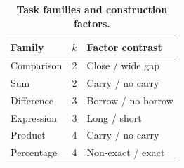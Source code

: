\begin{table}[H]
\caption{\textbf{Task families and construction factors.}}
\label{tab:families}
\centering\tablefont
\setlength{\tabcolsep}{4pt}
\begin{tabular}{@{}l c l@{}}
\toprule
\textbf{Family} & {$k$} & \textbf{Factor contrast} \\
\midrule
Comparison & 2 & Close / wide gap \\
Sum & 2 & Carry / no carry \\
\addlinespace[3pt]
Difference & 3 & Borrow / no borrow \\
Expression & 3 & Long / short \\
\addlinespace[3pt]
Product & 4 & Carry / no carry \\
Percentage & 4 & Non-exact / exact \\
\bottomrule
\end{tabular}
\end{table}
